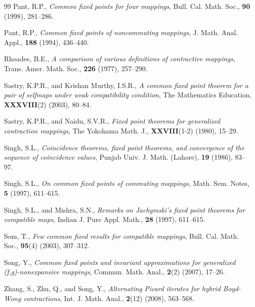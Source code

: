 \documentclass[a4paper,12pt,oneside]{article}
\numberwithin{equation}{section}
\begin{document}
\begin{thebibliography}{99}
Pant, R.P., \textit{Common fixed points for four mappings}, Bull. Cal. Math. Soc., \textbf{90} (1998), 281–286.

Pant, R.P., \textit{Common fixed points of noncommuting mappings}, J. Math. Anal. Appl., \textbf{188} (1994), 436–440.

Rhoades, B.E., \textit{A comparison of various definitions of contractive mappings}, Trans. Amer. Math. Soc., \textbf{226} (1977), 257–290.

Sastry, K.P.R., and Krishan Murthy, I.S.R., \textit{A common fixed point theorem for a pair of selfmaps under weak compatibility condition}, The Mathematics Education, \textbf{XXXVIII}(2) (2003), 80–84.

Sastry, K.P.R., and Naidu, S.V.R., \textit{Fixed point theorems for generalized contraction mappings}, The Yokohama Math. J., \textbf{XXVIII}(1-2) (1980), 15–29.

Singh, S.L., \textit{Coincidence theorems, fixed point theorems, and convergence of the sequence of coincidence values}, Punjab Univ. J. Math. (Lahore), \textbf{19} (1986), 83–97.

Singh, S.L., \textit{On common fixed points of commuting mappings}, Math. Sem. Notes, \textbf{5} (1997), 611–615.

Singh, S.L., and Mishra, S.N., \textit{Remarks on Jachymski's fixed point theorems for compatible maps}, Indian J. Pure Appl. Math., \textbf{28} (1997), 611–615.

Som, T., \textit{Few common fixed results for compatible mappings}, Bull. Cal. Math. Soc., \textbf{95}(4) (2003), 307–312.

Song, Y., \textit{Common fixed points and invariant approximations for generalized (f,g)-nonexpansive mappings}, Commun. Math. Anal., \textbf{2}(2) (2007), 17–26.

Zhang, S., Zhu, Q., and Song, Y., \textit{Alternating Picard iterates for hybrid Boyd-Wong contractions}, Int. J. Math. Anal., \textbf{2}(12) (2008), 563–568.

\end{thebibliography}
\end{document}
